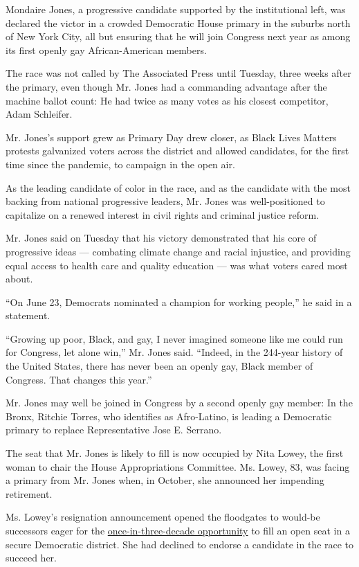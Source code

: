 Mondaire Jones, a progressive candidate supported by the institutional
left, was declared the victor in a crowded Democratic House primary in
the suburbs north of New York City, all but ensuring that he will join
Congress next year as among its first openly gay African-American
members.

The race was not called by The Associated Press until Tuesday, three
weeks after the primary, even though Mr. Jones had a commanding
advantage after the machine ballot count: He had twice as many votes as
his closest competitor, Adam Schleifer.

Mr. Jones's support grew as Primary Day drew closer, as Black Lives
Matters protests galvanized voters across the district and allowed
candidates, for the first time since the pandemic, to campaign in the
open air.

As the leading candidate of color in the race, and as the candidate with
the most backing from national progressive leaders, Mr. Jones was
well-positioned to capitalize on a renewed interest in civil rights and
criminal justice reform.

Mr. Jones said on Tuesday that his victory demonstrated that his core of
progressive ideas --- combating climate change and racial injustice, and
providing equal access to health care and quality education --- was what
voters cared most about.

``On June 23, Democrats nominated a champion for working people,'' he
said in a statement.

``Growing up poor, Black, and gay, I never imagined someone like me
could run for Congress, let alone win,'' Mr. Jones said. ``Indeed, in
the 244-year history of the United States, there has never been an
openly gay, Black member of Congress. That changes this year.''

Mr. Jones may well be joined in Congress by a second openly gay member:
In the Bronx, Ritchie Torres, who identifies as Afro-Latino, is leading
a Democratic primary to replace Representative Jose E. Serrano.

The seat that Mr. Jones is likely to fill is now occupied by Nita Lowey,
the first woman to chair the House Appropriations Committee. Ms. Lowey,
83, was facing a primary from Mr. Jones when, in October, she announced
her impending retirement.

Ms. Lowey's resignation announcement opened the floodgates to would-be
successors eager for the
\href{https://www.nytimes.com/2020/06/19/nyregion/democratic-primary-house-ny.html}{once-in-three-decade
opportunity} to fill an open seat in a secure Democratic district. She
had declined to endorse a candidate in the race to succeed her.

